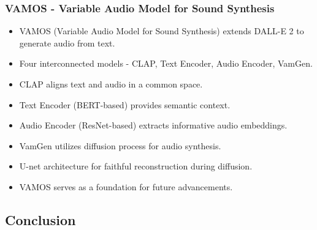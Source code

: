 \begin{frame}
    \frametitle{VAMOS - Variable Audio Model for Sound Synthesis}

    \begin{itemize}
        \item VAMOS (Variable Audio Model for Sound Synthesis) extends DALL-E 2 to generate audio from text.
        \item Four interconnected models - CLAP, Text Encoder, Audio Encoder, VamGen.
        \item CLAP aligns text and audio in a common space.
        \item Text Encoder (BERT-based) provides semantic context.
        \item Audio Encoder (ResNet-based) extracts informative audio embeddings.
        \item VamGen utilizes diffusion process for audio synthesis.
        \item U-net architecture for faithful reconstruction during diffusion.
        \item VAMOS serves as a foundation for future advancements.
    \end{itemize}

\end{frame}



\subsection{Conclusion}

